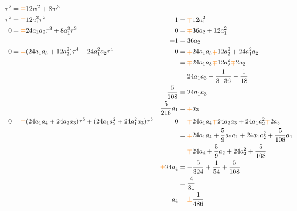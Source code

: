 \documentclass{article}
\begin{document}
\begin{align*}
\tau^2 & = \textcolor{orange}{\mp}12w^2 + 8w^3\\
\tau^2 & = \textcolor{orange}{\mp}12 a_1^2 \tau^2 & 1 & = \textcolor{orange}{\mp}12 a_1^2 \\
0 & = \textcolor{orange}{\mp}24 a_1 a_2 \tau^3 + 8a_1^3 \tau^3 & 0 & = \textcolor{orange}{\mp}36 a_2 + 12 a_1^2 \\
& & -1 & = 36 a_2 \\
0 & = \textcolor{orange}{\mp}(24a_1 a_3 + 12 a_2^2) \tau^4 + 24 a_1^2 a_2 \tau^4 & 0 & = \textcolor{orange}{\mp}24 a_1 a_3 \textcolor{orange}{\mp} 12 a_2^2 + 24 a_1^2 a_2 \\
& & & = \textcolor{orange}{\mp}24 a_1 a_3 \textcolor{orange}{\mp} 12 a_2^2 \textcolor{orange}{\mp} 2 a_2 \\
& & & = 24 a_1 a_3 + \frac{1}{3 \cdot 36} - \frac{1}{18} \\
& & \frac{5}{108} & = 24 a_1 a_3 \\
& & \frac{5}{216} a_1 & = \textcolor{orange}{\mp}a_3 \\
0 & = \textcolor{orange}{\mp}(24 a_1 a_4 + 24 a_2 a_3) \tau^5 + (24 a_1 a_2^2 + 24 a_1^2 a_3) \tau^5 & 0 & = \textcolor{orange}{\mp}24 a_1 a_4 \textcolor{orange}{\mp} 24 a_2 a_3 + 24 a_1 a_2^2 \textcolor{orange}{\mp} 2 a_3 \\
& & & = \textcolor{orange}{\mp}24 a_1 a_4 + \frac{5}{9} a_2 a_1 + 24 a_1 a_2^2 + \frac{5}{108} a_1 \\
& & & = \textcolor{orange}{\mp}24 a_4 + \frac{5}{9} a_2 + 24 a_2^2 + \frac{5}{108} \\
& & \textcolor{orange}{\pm}24 a_4 & = -\frac{5}{324} + \frac{1}{54} + \frac{5}{108} \\
& & & = \frac{4}{81} \\
& & a_4 & = \textcolor{orange}{\pm} \frac{1}{486}
\end{align*}
\end{document}
